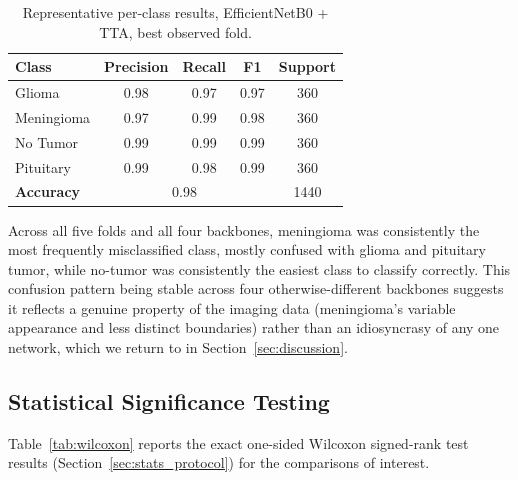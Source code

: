 \documentclass[11pt]{article}
\begin{document}
\begin{table}[htbp]
\centering
\caption{Representative per-class results, EfficientNetB0 + TTA, best observed fold.}
\label{tab:perclass}
\small
\begin{tabular*}{\textwidth}{@{\extracolsep{\fill}}lcccc@{}}
\toprule
\textbf{Class} & \textbf{Precision} & \textbf{Recall} & \textbf{F1} & \textbf{Support} \\
\midrule
Glioma      & 0.98 & 0.97 & 0.97 & 360 \\
Meningioma  & 0.97 & 0.99 & 0.98 & 360 \\
No Tumor    & 0.99 & 0.99 & 0.99 & 360 \\
Pituitary   & 0.99 & 0.98 & 0.99 & 360 \\
\textbf{Accuracy} & \multicolumn{3}{c}{0.98} & 1440 \\
\bottomrule
\end{tabular*}
\end{table}

Across all five folds and all four backbones, meningioma was consistently the most frequently misclassified class, mostly confused with glioma and pituitary tumor, while no-tumor was consistently the easiest class to classify correctly. This confusion pattern being stable across four otherwise-different backbones suggests it reflects a genuine property of the imaging data (meningioma's variable appearance and less distinct boundaries) rather than an idiosyncrasy of any one network, which we return to in Section~\ref{sec:discussion}.

\subsection{Statistical Significance Testing}
\label{sec:stats_results}

Table~\ref{tab:wilcoxon} reports the exact one-sided Wilcoxon signed-rank test results (Section~\ref{sec:stats_protocol}) for the comparisons of interest.
\end{document}
